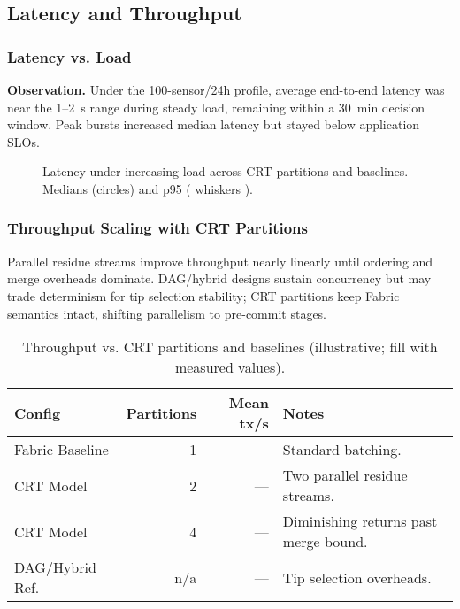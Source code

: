 \subsection{Latency and Throughput}

\subsubsection{Latency vs. Load}
\textbf{Observation.} Under the 100-sensor/24h profile, average end-to-end latency was near the 1–2~s range during steady load, remaining within a 30~min decision window. Peak bursts increased median latency but stayed below application SLOs.\ %
\begin{figure}[!t]
  \centering
  \caption{Latency under increasing load across CRT partitions and baselines. Medians (circles) and p95 ( whiskers ).}
  \label{fig:latency-load}
\end{figure}

\subsubsection{Throughput Scaling with CRT Partitions}
Parallel residue streams improve throughput nearly linearly until ordering and merge overheads dominate. DAG/hybrid designs sustain concurrency but may trade determinism for tip selection stability; CRT partitions keep Fabric semantics intact, shifting parallelism to pre-commit stages.
\begin{table}[!t]
  \centering
  \caption{Throughput vs. CRT partitions and baselines (illustrative; fill with measured values).}
  \label{tab:throughput-crt}
  \begin{tabular}{lrrl}
    \toprule
    Config & Partitions & Mean tx/s & Notes \\
    \midrule
    Fabric Baseline & 1 & --- & Standard batching. \\
    CRT Model & 2 & --- & Two parallel residue streams. \\
    CRT Model & 4 & --- & Diminishing returns past merge bound. \\
    DAG/Hybrid Ref. & n/a & --- & Tip selection overheads. \\
    \bottomrule
  \end{tabular}
\end{table}

